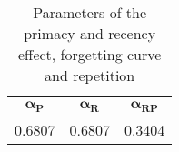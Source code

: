 \begin{table}[tb]
  \caption{Parameters of the primacy and recency effect, forgetting curve and repetition}
  \centering
  \begin{tabular}{|ccc|}
    \hline
    $\bm{\alpha_{P}}$ & $\bm{\alpha_{R}}$ & $\bm{\alpha_{RP}}$\\
    \hline
    0.6807 & 0.6807 & 0.3404\\
    \hline
  \end{tabular}
  \label{tbl:Parameters_MemoryEffects}
\end{table}
